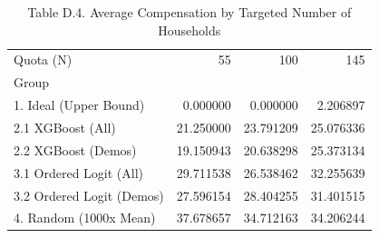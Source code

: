 \begin{table}
\caption{Table D.4. Average Compensation by Targeted Number of Households}
\begin{tabular}{lrrr}
\toprule
Quota (N) & 55 & 100 & 145 \\
Group &  &  &  \\
\midrule
1. Ideal (Upper Bound) & 0.000000 & 0.000000 & 2.206897 \\
2.1 XGBoost (All) & 21.250000 & 23.791209 & 25.076336 \\
2.2 XGBoost (Demos) & 19.150943 & 20.638298 & 25.373134 \\
3.1 Ordered Logit (All) & 29.711538 & 26.538462 & 32.255639 \\
3.2 Ordered Logit (Demos) & 27.596154 & 28.404255 & 31.401515 \\
4. Random (1000x Mean) & 37.678657 & 34.712163 & 34.206244 \\
\bottomrule
\end{tabular}
\end{table}
